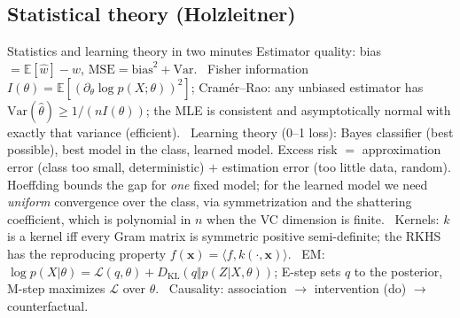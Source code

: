 \subsection{Statistical theory (Holzleitner)}

\begin{summary}{Statistics and learning theory in two minutes}
\textsf{Estimator quality:} bias $=\mathbb{E}[\hat w]-w$, $\mathrm{MSE}=\mathrm{bias}^2+\mathrm{Var}$. \
\textsf{Fisher information} $I(\theta)=\mathbb{E}[(\partial_\theta\log p(X;\theta))^2]$; \textsf{Cram\'er--Rao:}
any unbiased estimator has $\mathrm{Var}(\hat\theta)\ge1/(nI(\theta))$; the MLE is consistent and
asymptotically normal with exactly that variance (efficient). \
\textsf{Learning theory (0--1 loss):} Bayes classifier (best possible), best model in the class,
learned model. Excess risk $=$ approximation error (class too small, deterministic) $+$ estimation
error (too little data, random). Hoeffding bounds the gap for \emph{one} fixed model; for the learned
model we need \emph{uniform} convergence over the class, via symmetrization and the shattering
coefficient, which is polynomial in $n$ when the VC dimension is finite. \
\textsf{Kernels:} $k$ is a kernel iff every Gram matrix is symmetric positive semi-definite; the RKHS
has the reproducing property $f(\mathbf{x})=\langle f,k(\cdot,\mathbf{x})\rangle$. \
\textsf{EM:} $\log p(X|\theta)=\mathcal{L}(q,\theta)+D_{\mathrm{KL}}(q\Vert p(Z|X,\theta))$; E-step sets
$q$ to the posterior, M-step maximizes $\mathcal{L}$ over $\theta$. \
\textsf{Causality:} association $\to$ intervention (do) $\to$ counterfactual.
\end{summary}



